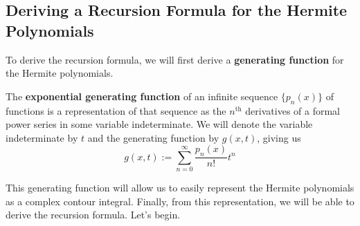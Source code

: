 \documentclass[titlepage]{article}
\numberwithin{equation}{section}
\begin{document}
\subsection{Deriving a Recursion Formula for the Hermite Polynomials}
To derive the recursion formula, we will first derive a \textbf{generating function} for the Hermite polynomials.
\begin{definition}
    The \textbf{exponential generating function} of an infinite sequence $\{p_n(x)\}$ of functions is a representation of that sequence as the $n^\text{th}$ derivatives of a formal power series in some variable indeterminate. We will denote the variable indeterminate by $t$ and the generating function by $g(x,t)$, giving us
    \begin{equation*}
        g(x,t) := \sum_{n=0}^\infty\frac{p_n(x)}{n!}t^n
    \end{equation*}
\end{definition}
This generating function will allow us to easily represent the Hermite polynomials as a complex contour integral. Finally, from this representation, we will be able to derive the recursion formula. Let's begin.
\end{document}
